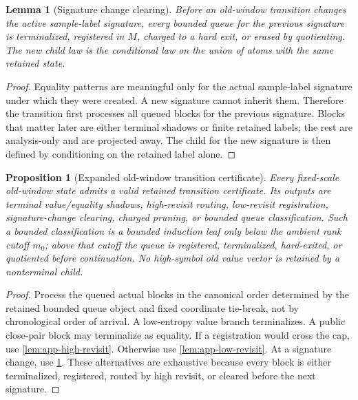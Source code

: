 \documentclass[11pt]{article}
\newcommand{\Cref}[1]{\ref{#1}}
\newtheorem{lemma}[theorem]{Lemma}
\newtheorem{proposition}[theorem]{Proposition}
\theoremstyle{remark}
\begin{document}
\begin{lemma}[Signature change clearing]\label{lem:app-signature-clear}
Before an old-window transition changes the active sample-label signature, every bounded queue for the previous signature is terminalized, registered in $M$, charged to a hard exit, or erased by quotienting.  The new child law is the conditional law on the union of atoms with the same retained state.
\end{lemma}

\begin{proof}
Equality patterns are meaningful only for the actual sample-label signature under which they were created.  A new signature cannot inherit them.  Therefore the transition first processes all queued blocks for the previous signature.  Blocks that matter later are either terminal shadows or finite retained labels; the rest are analysis-only and are projected away.  The child for the new signature is then defined by conditioning on the retained label alone.
\end{proof}

\begin{proposition}[Expanded old-window transition certificate]\label{prop:app-old-window-certificate}
Every fixed-scale old-window state admits a valid retained transition
certificate.  Its outputs are terminal value/equality shadows, high-revisit
routing, low-revisit registration, signature-change clearing, charged pruning,
or bounded queue classification.  Such a bounded classification is a bounded
induction leaf only below the ambient rank cutoff $m_0$; above that cutoff the
queue is registered, terminalized, hard-exited, or quotiented before
continuation.  No high-symbol old value vector is retained by a nonterminal
child.
\end{proposition}

\begin{proof}
Process the queued actual blocks in the canonical order determined by the retained bounded queue object and fixed coordinate tie-break, not by chronological order of arrival.  A low-entropy value branch terminalizes.  A public close-pair block may terminalize as equality.  If a registration would cross the cap, use \Cref{lem:app-high-revisit}.  Otherwise use \Cref{lem:app-low-revisit}.  At a signature change, use \Cref{lem:app-signature-clear}.  These alternatives are exhaustive because every block is either terminalized, registered, routed by high revisit, or cleared before the next signature.
\end{proof}
\end{document}
